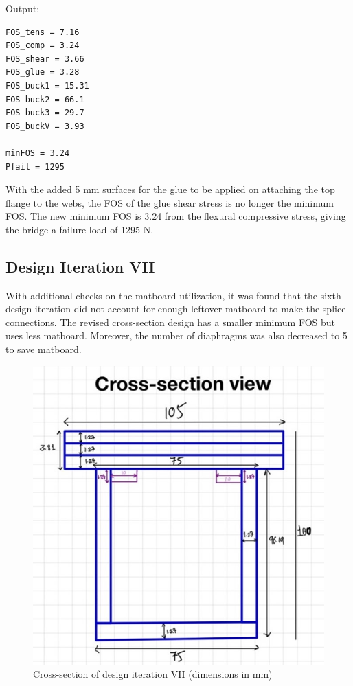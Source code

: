 \documentclass[11pt]{article}
\newcommand{\imagewidth}{.5\linewidth}
\begin{document}
Output:
\begin{lstlisting}[]
FOS_tens = 7.16
FOS_comp = 3.24
FOS_shear = 3.66
FOS_glue = 3.28
FOS_buck1 = 15.31
FOS_buck2 = 66.1
FOS_buck3 = 29.7
FOS_buckV = 3.93

minFOS = 3.24
Pfail = 1295      
\end{lstlisting}

With the added 5 mm surfaces for the glue to be applied on attaching the top flange to the webs, the FOS of the glue shear stress is no longer the minimum FOS. The new minimum FOS is 3.24 from the flexural compressive stress, giving the bridge a failure load of 1295 N.

\subsection{Design Iteration VII}

With additional checks on the matboard utilization, it was found that the sixth design iteration did not account for enough leftover matboard to make the splice connections. The revised cross-section design has a smaller minimum FOS but uses less matboard. Moreover, the number of diaphragms was also decreased to 5 to save matboard.

\begin{figure}[h]
    \centering
    \includegraphics[width=\imagewidth]{img/design-7-cs.jpg}
    \caption{Cross-section of design iteration VII (dimensions in mm)}
    \label{d7}
\end{figure}
\end{document}
